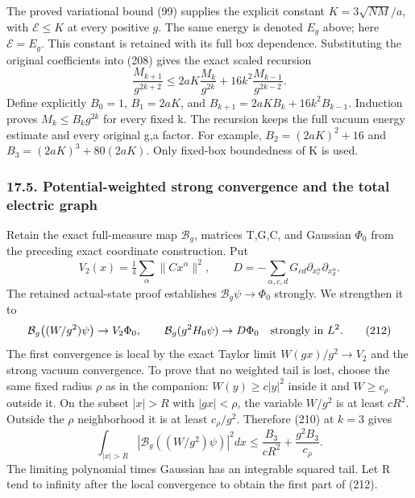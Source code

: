 \documentclass[
  11pt,
]{article}
\begin{document}
The proved variational bound (99) supplies the explicit constant
\(K=3\sqrt{NM}/a\), with \(\mathcal E\le K\) at every positive \(g\).
The same energy is denoted \(E_g\) above; here \(\mathcal E=E_g\). This
constant is retained with its full box dependence. Substituting the
original coefficients into (208) gives the exact scaled recursion \[
 \frac{M_{k+1}}{g^{2k+2}}
 \le 2aK\frac{M_k}{g^{2k}}+
                 16k^2\frac{M_{k-1}}{g^{2k-2}}.             \tag{210}
\] Define explicitly \(B_0=1\), \(B_1=2aK\), and
\(B_{k+1}=2aK B_k+16k^2 B_{k-1}\). Induction proves
\(M_k\le B_k g^{2k}\) for every fixed k. The recursion keeps the full
vacuum energy estimate and every original g,a factor. For example,
\(B_2=(2aK)^2+16\) and \(B_3=(2aK)^3+80(2aK)\). Only fixed-box
boundedness of K is used.

\subsubsection{17.5. Potential-weighted strong convergence and the total
electric
graph}\label{potential-weighted-strong-convergence-and-the-total-electric-graph}

Retain the exact full-measure map \(\mathcal B_g\), matrices T,G,C, and
Gaussian \(\Phi_0\) from the preceding exact coordinate construction.
Put \[
 V_2(x)=\tfrac14\sum_\alpha\|Cx^\alpha\|^2,
 \qquad D=-\sum_{\alpha,c,d}G_{cd}
                         \partial_{x_c^\alpha}\partial_{x_d^\alpha}.
                                                               \tag{211}
\] The retained actual-state proof establishes
\(\mathcal B_g\psi\to\Phi_0\) strongly. We strengthen it to \[
 \mathcal B_g\bigl((W/g^2)\psi\bigr)\to V_2\Phi_0,
 \qquad
 \mathcal B_g(g^2H_0\psi)\to D\Phi_0
                \quad\hbox{strongly in }L^2.                \tag{212}
\] The first convergence is local by the exact Taylor limit
\(W(gx)/g^2\to V_2\) and the strong vacuum convergence. To prove that no
weighted tail is lost, choose the same fixed radius \(\rho\) as in the
companion: \(W(y)\ge c|y|^2\) inside it and \(W\ge c_\rho\) outside it.
On the subset \(|x|>R\) with \(|gx|<\rho\), the variable \(W/g^2\) is at
least \(cR^2\). Outside the \(\rho\) neighborhood it is at least
\(c_\rho/g^2\). Therefore (210) at \(k=3\) gives \[
 \int_{|x|>R}|\mathcal B_g((W/g^2)\psi)|^2dx
  \le \frac{B_3}{cR^2}+\frac{g^2B_3}{c_\rho}.             \tag{213}
\] The limiting polynomial times Gaussian has an integrable squared
tail. Let R tend to infinity after the local convergence to obtain the
first part of (212).
\end{document}
